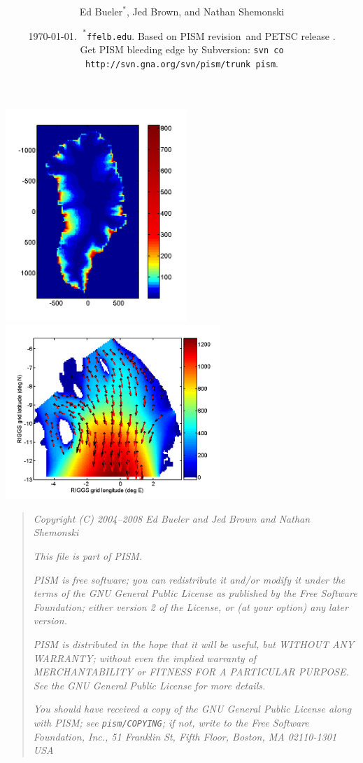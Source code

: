 \documentclass[11pt,final]{amsart}
\title[PISM User's Manual]{\protect{\Large PISM, a \underline{P}arallel \underline{I}ce \underline{S}heet \underline{M}odel:\normalsize} \\ \protect{\Large \bigskip \bigskip User's Manual\normalsize}}
\author[]{Ed $\text{Bueler}^\ast$, Jed Brown, and Nathan Shemonski}
\date{\today.  $\phantom{|}^\ast$\texttt{ffelb\@@uaf.edu}.  Based on PISM revision \PISMREV\,and PETSC release \PETSCREV.  \\\tiny Get PISM bleeding edge by Subversion: \texttt{svn co http://svn.gna.org/svn/pism/trunk pism}.}
\newcommand{\normalspacing}{\renewcommand{\baselinestretch}{1.1}\tiny\normalsize}
\begin{document}
\maketitle
\thispagestyle{empty}

\vspace{2.0in}
\begin{center}
\includegraphics[width=2.7in,keepaspectratio=true]{figs/greencbar_SSL2}\quad \includegraphics[width=3.2in,keepaspectratio=true]{figs/rossquiver}
\end{center}

\newpage
\phantom{bob}
\vspace{2in}
\begin{quote}
\textsl{Copyright (C) 2004--2008 Ed Bueler and Jed Brown and Nathan Shemonski}
\medskip

\noindent \textsl{This file is part of PISM.}
\medskip

\noindent \textsl{PISM is free software; you can redistribute it and/or modify it under the terms of the GNU General Public License as published by the Free Software Foundation; either version 2 of the License, or (at your option) any later version.}
\medskip

\noindent \textsl{PISM is distributed in the hope that it will be useful, but WITHOUT ANY WARRANTY; without even the implied warranty of MERCHANTABILITY or FITNESS FOR A PARTICULAR PURPOSE.  See the GNU General Public License for more details.}
\medskip

\noindent \textsl{You should have received a copy of the GNU General Public License along with PISM; see \emph{\texttt{pism/COPYING}}; if not, write to the Free Software Foundation, Inc., 51 Franklin St, Fifth Floor, Boston, MA  02110-1301 USA}
\end{quote}
\vspace{1in}
\normalspacing
\end{document}
